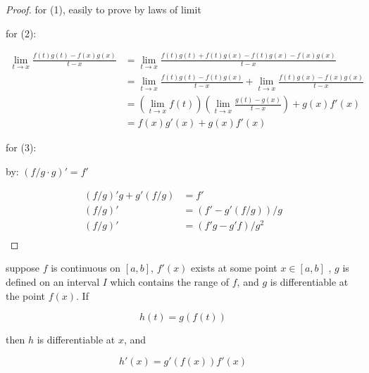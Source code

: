 \begin{proof}
    for (1), easily to prove by laws of limit

    for (2):

    \begin{align*}
        \lim_{t \to x}\frac{f(t)g(t) - f(x)g(x)}{t-x} &= \lim_{t \to x}\frac{f(t)g(t) + f(t)g(x) - f(t)g(x) - f(x)g(x)}{t-x} \\
        &= \lim_{t \to x}\frac{f(t)g(t) - f(t)g(x)}{t-x} + \lim_{t \to x}\frac{f(t)g(x) - f(x)g(x)}{t-x} \\
        &= \left(\lim_{t \to x}f(t) \right)\left( \lim_{t \to x}\frac{g(t) - g(x)}{t-x} \right) + g(x)f'(x) \\
        &= f(x)g'(x) + g(x)f'(x)
    \end{align*}

    for (3):

    by: $(f/g \cdot g)' = f'$

    \begin{align*}
        (f/g)'g + g'(f/g) &= f' \\
        (f/g)' &= (f' - g'(f/g))/g \\
        (f/g)' &= (f'g - g'f)/g^2 \\
    \end{align*}
\end{proof}

\begin{thm}
    suppose $f$ is continuous on $[a,b]$, $f'(x)$ exists at some point $x \in [a,b]$
    , $g$ is defined on an interval $I$ which contains the range of $f$, and $g$ is differentiable
    at the point $f(x)$. If

    \[
        h(t) = g (f(t))
    \]

    then $h$ is differentiable at $x$, and 

    \[
        h'(x) = g'(f(x))f'(x)
    \]
\end{thm}

